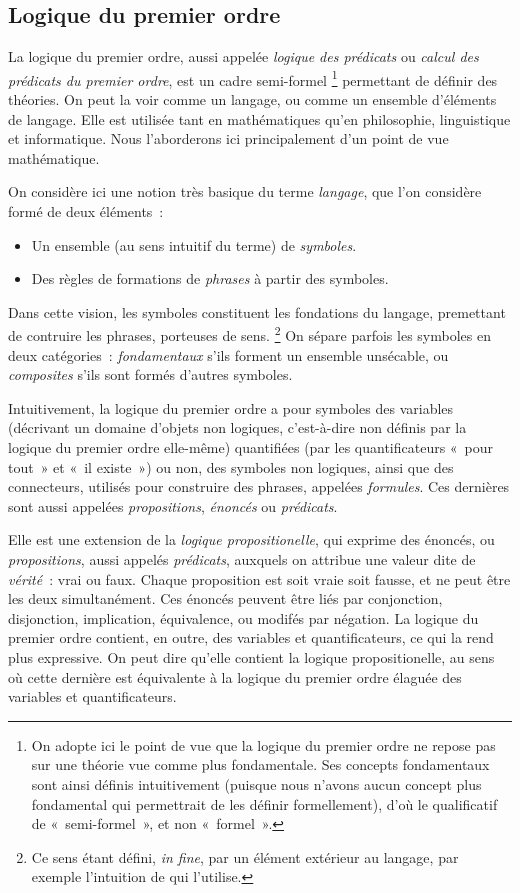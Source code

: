 \subsection{Logique du premier ordre}

La logique du premier ordre, aussi appelée \textit{logique des prédicats} ou \textit{calcul des prédicats du premier ordre}, est un cadre semi-formel%
\footnote{On adopte ici le point de vue que la logique du premier ordre ne repose pas sur une théorie vue comme plus fondamentale. Ses concepts fondamentaux sont ainsi définis intuitivement (puisque nous n'avons aucun concept plus fondamental qui permettrait de les définir formellement), d'où le qualificatif de « semi-formel », et non « formel ».} 
permettant de définir des théories. 
On peut la voir comme un langage, ou comme un ensemble d'éléments de langage.
Elle est utilisée tant en mathématiques qu'en philosophie, linguistique et informatique. 
Nous l'aborderons ici principalement d'un point de vue mathématique.

On considère ici une notion très basique du terme \textit{langage}, que l'on considère formé de deux éléments : 
\begin{itemize}[nosep]
    \item Un ensemble (au sens intuitif du terme) de \textit{symboles}.
    \item Des règles de formations de \textit{phrases} à partir des symboles.
\end{itemize}
Dans cette vision, les symboles constituent les fondations du langage, premettant de contruire les phrases, porteuses de sens.%
\footnote{Ce sens étant défini, \textit{in fine}, par un élément extérieur au langage, par exemple l'intuition de qui l'utilise.} 
On sépare parfois les symboles en deux catégories : \textit{fondamentaux} s'ils forment un ensemble unsécable, ou \textit{composites} s'ils sont formés d'autres symboles.

Intuitivement, la logique du premier ordre a pour symboles des variables (décrivant un domaine d'objets non logiques, c'est-à-dire non définis par la logique du premier ordre elle-même) quantifiées (par les quantificateurs « pour tout » et « il existe ») ou non, des symboles non logiques, ainsi que des connecteurs, utilisés pour construire des phrases, appelées \textit{formules}. 
Ces dernières sont aussi appelées \textit{propositions}, \textit{énoncés} ou \textit{prédicats}. 

Elle est une extension de la \textit{logique propositionelle}, qui exprime des énoncés, ou \textit{propositions}, aussi appelés \textit{prédicats}, auxquels on attribue une valeur dite de \textit{vérité} : vrai ou faux. 
Chaque proposition est soit vraie soit fausse, et ne peut être les deux simultanément. 
Ces énoncés peuvent être liés par conjonction, disjonction, implication, équivalence, ou modifés par négation. 
La logique du premier ordre contient, en outre, des variables et quantificateurs, ce qui la rend plus expressive. 
On peut dire qu'elle contient la logique propositionelle, au sens où cette dernière est équivalente à la logique du premier ordre élaguée des variables et quantificateurs.

